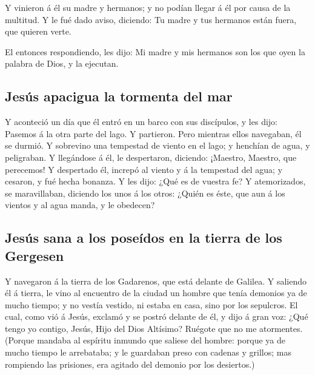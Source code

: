  Y vinieron á él su madre y hermanos; y no podían llegar
á él por causa de la multitud.  Y le fué dado aviso,
diciendo: Tu madre y tus hermanos están fuera, que quieren verte.

 El entonces respondiendo, les dijo: Mi madre y mis
hermanos son los que oyen la palabra de Dios, y la ejecutan.

\hypertarget{jesuxfas-apacigua-la-tormenta-del-mar}{%
\subsection{Jesús apacigua la tormenta del
mar}\label{jesuxfas-apacigua-la-tormenta-del-mar}}

 Y aconteció un día que él entró en un barco con sus
discípulos, y les dijo: Pasemos á la otra parte del lago. Y partieron.
 Pero mientras ellos navegaban, él se durmió. Y sobrevino
una tempestad de viento en el lago; y henchían de agua, y peligraban.
 Y llegándose á él, le despertaron, diciendo: ¡Maestro,
Maestro, que perecemos! Y despertado él, increpó al viento y á la
tempestad del agua; y cesaron, y fué hecha bonanza.  Y
les dijo: ¿Qué es de vuestra fe? Y atemorizados, se maravillaban,
diciendo los unos á los otros: ¿Quién es éste, que aun á los vientos y
al agua manda, y le obedecen?

\hypertarget{jesuxfas-sana-a-los-poseuxeddos-en-la-tierra-de-los-gergesen}{%
\subsection{Jesús sana a los poseídos en la tierra de los
Gergesen}\label{jesuxfas-sana-a-los-poseuxeddos-en-la-tierra-de-los-gergesen}}

 Y navegaron á la tierra de los Gadarenos, que está
delante de Galilea.  Y saliendo él á tierra, le vino al
encuentro de la ciudad un hombre que tenía demonios ya de mucho tiempo;
y no vestía vestido, ni estaba en casa, sino por los sepulcros.
 El cual, como vió á Jesús, exclamó y se postró delante
de él, y dijo á gran voz: ¿Qué tengo yo contigo, Jesús, Hijo del Dios
Altísimo? Ruégote que no me atormentes.  (Porque mandaba
al espíritu inmundo que saliese del hombre: porque ya de mucho tiempo le
arrebataba; y le guardaban preso con cadenas y grillos; mas rompiendo
las prisiones, era agitado del demonio por los desiertos.)

